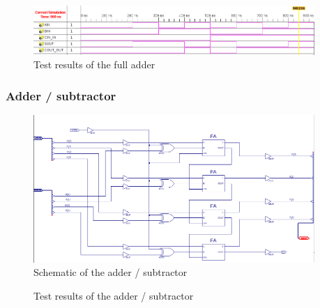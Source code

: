 \documentclass[11pt]{article}
\begin{document}
\begin{figure}[htpb]
	\centering
	\includegraphics[width=0.95\textwidth]{FA_test}
	\caption{Test results of the full adder}
	\label{fig:FA_test}
\end{figure}

\subsubsection{Adder / subtractor}
\begin{figure}[htpb]
	\centering
	\includegraphics[width=0.95\textwidth]{add_sub-schematic}
	\caption{Schematic of the adder / subtractor}
	\label{fig:AS_schematic}
\end{figure}

\begin{figure}[htpb]
	\centering
	\caption{Test results of the adder / subtractor}
	\label{fig:AS_test}
\end{figure}
\end{document}
